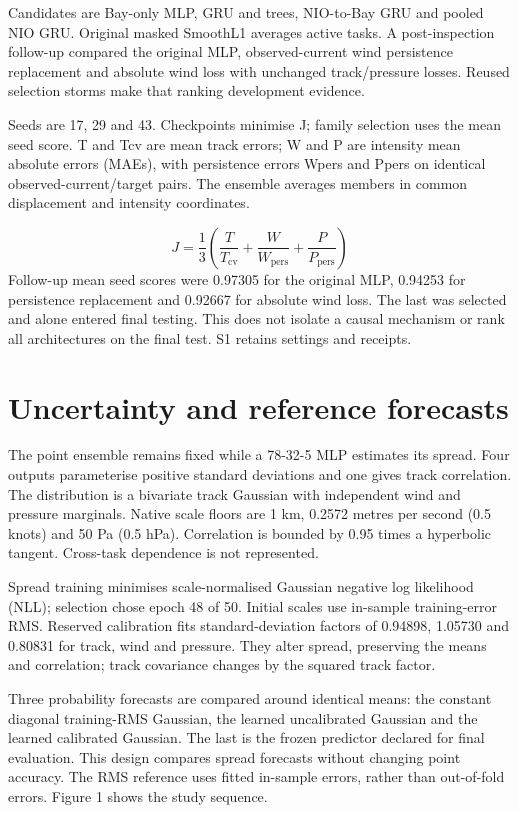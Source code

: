 \documentclass[pdflatex,sn-mathphys-num,referee,a4paper]{sn-jnl}
\begin{document}
Candidates are Bay-only MLP, GRU and trees, NIO-to-Bay GRU and pooled NIO GRU. Original masked SmoothL1 averages active tasks. A post-inspection follow-up compared the original MLP, observed-current wind persistence replacement and absolute wind loss with unchanged track/pressure losses. Reused selection storms make that ranking development evidence.

Seeds are 17, 29 and 43. Checkpoints minimise J; family selection uses the mean seed score. T and Tcv are mean track errors; W and P are intensity mean absolute errors (MAEs), with persistence errors Wpers and Ppers on identical observed-current/target pairs. The ensemble averages members in common displacement and intensity coordinates.

\begin{equation}
J=\frac{1}{3}\left(\frac{T}{T_{\mathrm{cv}}}+\frac{W}{W_{\mathrm{pers}}}+\frac{P}{P_{\mathrm{pers}}}\right)
\end{equation}
Follow-up mean seed scores were 0.97305 for the original MLP, 0.94253 for persistence replacement and 0.92667 for absolute wind loss. The last was selected and alone entered final testing. This does not isolate a causal mechanism or rank all architectures on the final test. S1 retains settings and receipts.


\section{Uncertainty and reference forecasts}
The point ensemble remains fixed while a 78-32-5 MLP estimates its spread. Four outputs parameterise positive standard deviations and one gives track correlation. The distribution is a bivariate track Gaussian with independent wind and pressure marginals. Native scale floors are 1 km, 0.2572 metres per second (0.5 knots) and 50 Pa (0.5 hPa). Correlation is bounded by 0.95 times a hyperbolic tangent. Cross-task dependence is not represented.

Spread training minimises scale-normalised Gaussian negative log likelihood (NLL); selection chose epoch 48 of 50. Initial scales use in-sample training-error RMS. Reserved calibration fits standard-deviation factors of 0.94898, 1.05730 and 0.80831 for track, wind and pressure. They alter spread, preserving the means and correlation; track covariance changes by the squared track factor.

Three probability forecasts are compared around identical means: the constant diagonal training-RMS Gaussian, the learned uncalibrated Gaussian and the learned calibrated Gaussian. The last is the frozen predictor declared for final evaluation. This design compares spread forecasts without changing point accuracy. The RMS reference uses fitted in-sample errors, rather than out-of-fold errors. Figure 1 shows the study sequence.
\end{document}
